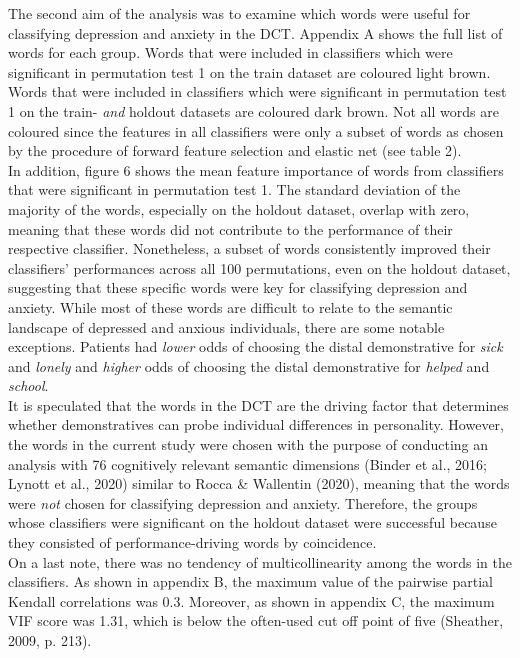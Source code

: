 \documentclass[11pt, a4paper]{article}
\begin{document}
The second aim of the analysis was to examine which words were useful for classifying depression and anxiety in the DCT. Appendix A shows the full list of words for each group. Words that were included in classifiers which were significant in permutation test 1 on the train dataset are coloured light brown. Words that were included in classifiers which were significant in permutation test 1 on the train- \textit{and} holdout datasets are coloured dark brown. Not all words are coloured since the features in all classifiers were only a subset of words as chosen by the procedure of forward feature selection and elastic net (see table 2).\\
In addition, figure 6 shows the mean feature importance of words from classifiers that were significant in permutation test 1. The standard deviation of the majority of the words, especially on the holdout dataset, overlap with zero, meaning that these words did not contribute to the performance of their respective classifier. Nonetheless, a subset of words consistently improved their classifiers’ performances across all 100 permutations, even on the holdout dataset, suggesting that these specific words were key for classifying depression and anxiety. While most of these words are difficult to relate to the semantic landscape of depressed and anxious individuals, there are some notable exceptions. Patients had \textit{lower} odds of choosing the distal demonstrative for \textit{sick} and \textit{lonely} and \textit{higher} odds of choosing the distal demonstrative for \textit{helped} and \textit{school}. \\
It is speculated that the words in the DCT are the driving factor that determines whether demonstratives can probe individual differences in personality. However, the words in the current study were chosen with the purpose of conducting an analysis with 76 cognitively relevant semantic dimensions (Binder et al., 2016; Lynott et al., 2020) similar to Rocca \& Wallentin (2020), meaning that the words were \textit{not} chosen for classifying depression and anxiety. Therefore, the groups whose classifiers were significant on the holdout dataset were successful because they consisted of performance-driving words by coincidence. \\

On a last note, there was no tendency of multicollinearity among the words in the classifiers. As shown in appendix B, the maximum value of the pairwise partial Kendall correlations was 0.3. Moreover, as shown in appendix C, the maximum VIF score was 1.31, which is below the often-used cut off point of five (Sheather, 2009, p. 213). 
\end{document}
